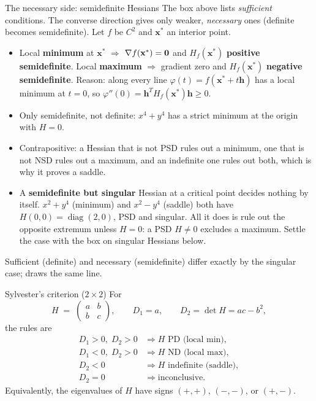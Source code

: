 \begin{rulebox}{The necessary side: semidefinite Hessians}
The box above lists \emph{sufficient} conditions. The converse direction gives only weaker,
\emph{necessary} ones (definite becomes semidefinite). Let $f$ be $C^2$ and $\mathbf{x}^*$ an interior
point.
\begin{itemize}[leftmargin=1.6em,itemsep=0.3ex]
  \item Local \textbf{minimum} at $\mathbf{x}^*$ $\Rightarrow$
        $\nabla f(\mathbf{x}^*)=\mathbf{0}$ and $H_f(\mathbf{x}^*)$
        \textbf{positive semidefinite}. Local \textbf{maximum}
        $\Rightarrow$ gradient zero and $H_f(\mathbf{x}^*)$
        \textbf{negative semidefinite}. Reason: along every line
        $\varphi(t)=f(\mathbf{x}^*+t\mathbf{h})$ has a local minimum at
        $t=0$, so $\varphi''(0)=\mathbf{h}^{T}H_f(\mathbf{x}^*)\mathbf{h}\ge0$.
  \item Only semidefinite, not definite: $x^{4}+y^{4}$ has a strict
        minimum at the origin with $H=0$.
  \item Contrapositive: a Hessian that is not PSD rules out a minimum, one
        that is not NSD rules out a maximum, and an indefinite one rules out
        both, which is why it proves a saddle.
  \item A \textbf{semidefinite but singular} Hessian at a critical point
        decides nothing by itself. $x^{2}+y^{4}$ (minimum) and $x^{2}-y^{4}$
        (saddle) both have $H(0,0)=\operatorname{diag}(2,0)$, PSD and
        singular. All it does is rule out the opposite extremum unless
        $H=0$: a PSD $H\neq0$ excludes a maximum. Settle the case with the
        box on singular Hessians below.
\end{itemize}
Sufficient (definite) and necessary (semidefinite) differ exactly by the
singular case;  draws the same line.
\end{rulebox}

\begin{rulebox}{Sylvester's criterion ($2\times2$)}
For
\[
H \;=\; \begin{pmatrix} a & b \\ b & c \end{pmatrix},
\qquad D_1 = a, \qquad D_2 = \det H = a c - b^2,
\]
the rules are
\[
\begin{array}{ll}
D_1 > 0,\; D_2 > 0 & \Rightarrow H \text{ PD (local min)}, \\
D_1 < 0,\; D_2 > 0 & \Rightarrow H \text{ ND (local max)}, \\
D_2 < 0 & \Rightarrow H \text{ indefinite (saddle)}, \\
D_2 = 0 & \Rightarrow \text{inconclusive}.
\end{array}
\]
Equivalently, the eigenvalues of $H$ have signs $(+,+)$, $(-,-)$, or
$(+,-)$.
\end{rulebox}

